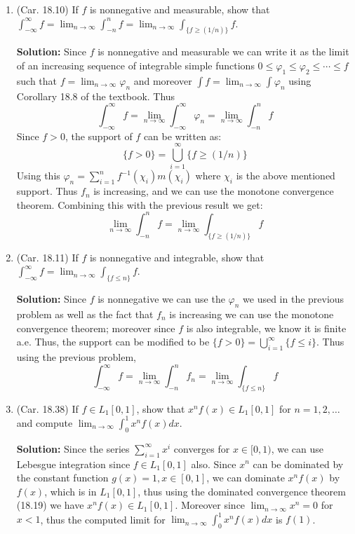 \documentclass{article}
\def\ge{\geqslant}
\def\le{\leqslant}
\def\phi{\varphi}
\def\to{\rightarrow}
\begin{document}
\begin{enumerate}
\item (Car. 18.10) If $f$ is nonnegative and measurable, show that $\int_{-\infty}^\infty f = \lim_{n\to\infty}
  \int_{-n}^n f = \lim_{n\to\infty} \int_{\{f \ge (1/n)\}} f$.

\textbf{Solution:} Since $f$ is nonnegative and measurable we can write
it as the limit of an increasing sequence of integrable simple functions
$0 \le \phi_1 \le \phi_2 \le \cdots \le f$ such that 
$f=\lim_{n\to\infty} \phi_n$ and moreover $\int f=\lim_{n\to\infty}\int\phi_n$
using Corollary 18.8 of the textbook. Thus
\[
\int_{-\infty}^\infty f = \lim_{n\to\infty}\int_{-\infty}^\infty  \phi_n = \lim_{n\to\infty}\int_{-n}^n f
\]
Since $f>0$, the support of $f$ can be written as:
\[
\{f>0\}=\bigcup_{i=1}^\infty \{ f\ge(1/n)\}
\]
Using this $\phi_n=\sum_{i=1}^n f^{-1}(\chi_i)m(\chi_i)$ where $\chi_i$ is the
above mentioned support. 
Thus $f_n$ is increasing, and we can use the monotone convergence theorem.
Combining this with the previous result we get:
\[
\lim_{n\to\infty}\int_{-n}^n f = \lim_{n\to\infty} \int_{\{f\ge(1/n)\}} f
\]

\item (Car. 18.11) If $f$ is nonnegative and integrable, show that $\int_{-\infty}^\infty f = \lim_{n\to\infty}
  \int_{\{f\le n\}} f$.

\textbf{Solution:} Since $f$ is nonnegative we can use the $\phi_n$ we
used in the previous problem as well as the fact that $f_n$ is increasing
we can use the monotone convergence theorem; 
moreover since $f$ is also integrable, we know
it is finite a.e. Thus, the support can be modified to 
be $\{f>0\} = \bigcup_{i=1}^\infty \{f\le i\}$. Thus using the previous problem,
\[
\int_{-\infty}^\infty f = \lim_{n\to\infty}\int_{-n}^n  f_n = \lim_{n\to\infty} \int_{\{f\le n\} } f
\]

\item (Car. 18.38) If $f\in L_1[0,1]$, show that $x^nf(x) \in L_1[0,1]$ for $n=1,2,\ldots$ and compute
  $\lim_{n\to\infty} \int_0^1 x^n f(x) dx$.

\textbf{Solution:} Since the series $\sum_{i=1}^\infty x^i$ converges for 
$x\in [0,1)$, we can use Lebesgue integration since $f\in L_1[0,1]$ also.
Since $x^n$ can be dominated by the constant function $g(x)=1,x\in[0,1]$, 
we can dominate
$x^nf(x)$ by $f(x)$, which is in $L_1[0,1]$, thus using the dominated
convergence theorem (18.19) we have $x^nf(x)\in L_1[0,1]$.
Moreover since $\lim_{n\to\infty} x^n=0$ for $x<1$, thus the computed 
limit for   $\lim_{n\to\infty} \int_0^1 x^n f(x) dx$ is $f(1)$.


\end{enumerate}
\end{document}

